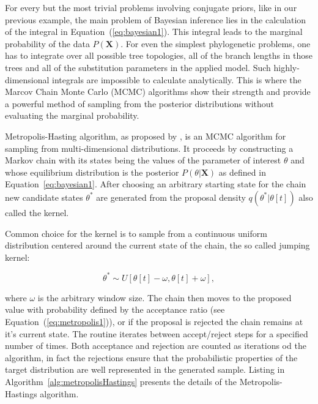 For every but the most trivial problems involving conjugate priors, like in our previous example, the main problem of Bayesian inference lies in the calculation of the integral in Equation~(\ref{eq:bayesian1}).
This integral leads to the marginal probability of the data $P\left(\mathbf{X}\right)$. 
For even the simplest phylogenetic problems, one has to integrate over all possible tree topologies, all of the branch lengths in those trees and all of the substitution parameters in the applied model.
Such highly-dimensional integrals are impossible to calculate analytically.
This is where the Marcov Chain Monte Carlo (MCMC) algorithms show their strength and provide a powerful method of sampling from the posterior distributions without evaluating the marginal probability.

Metropolis-Hasting algorithm, as proposed by \citet{Metropolis1953}, is an MCMC algorithm for sampling from multi-dimensional distributions.
It proceeds by constructing a Markov chain with its states being the values of the parameter of interest $\theta$ and whose equilibrium distribution is the posterior $P\left(\theta|\mathbf{X}\right)$ as defined in Equation~\ref{eq:bayesian1}.
After choosing an arbitrary starting state for the chain new candidate states $\theta^{*}$ are generated from the proposal density $q(\theta^{*} | \theta[t])$ also called the kernel.

Common choice for the kernel is to sample from a continuous uniform distribution centered around the current state of the chain, the so called jumping kernel: 

$$\theta^{*}\sim U\left[\theta[t]-\omega,\theta[t]+\omega\right],$$

\noindent
where $\omega$ is the arbitrary window size.
The chain then moves to the proposed value with probability defined by the acceptance ratio (see Equation~(\ref{eq:metropolis1})), or if the proposal is rejected the chain remains at it's current state.
The routine iterates between accept/reject steps for a specified number of times.
Both acceptance and rejection are counted as iterations od the algorithm, in fact the rejections ensure that the probabilistic properties of the target distribution are well represented in the generated sample.  
Listing in Algorithm~\ref{alg:metropolisHastings} presents the details of the Metropolis-Hastings algorithm.

